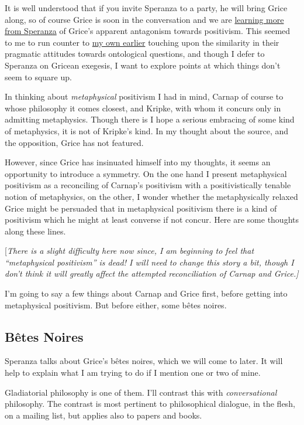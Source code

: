 \documentclass{article}
\begin{document}
It is well understood that if you invite Speranza to a party, he will bring Grice along, so of course Grice is soon in the conversation and we are \href{http://rbjones.com/pipermail/hist-analytic_rbjones.com/2009q2/000268.html}{learning more from Speranza} of Grice's apparent antagonism towards positivism.
This seemed to me to run counter to \href{http://rbjones.com/pipermail/hist-analytic_rbjones.com/2009q2/000254.html}{my own earlier} touching upon the similarity in their pragmatic attitudes towards ontological questions, and though I defer to Speranza on Gricean exegesis, I want to explore points at which things don't seem to square up.

In thinking about {\it metaphysical} positivism I had in mind, Carnap of course to whose philosophy it comes closest, and Kripke, with whom it concurs only in admitting metaphysics.
Though there is I hope a serious embracing of some kind of metaphysics, it is not of Kripke's kind.
In my thought about the source, and the opposition, Grice has not featured.

However, since Grice has insinuated himself into my thoughts, it seems an opportunity to introduce a symmetry.
On the one hand I present metaphysical positivism as a reconciling of Carnap's positivism with a positivistically tenable notion of metaphysics, on the other, I wonder whether the metaphysically relaxed Grice might be persuaded that in metaphysical positivism there is a kind of positivism which he might at least converse if not concur. 
Here are some thoughts along these lines.

{[\it There is a slight difficulty here now since, I am beginning to feel that ``metaphysical positivism'' is dead!
I will need to change this story a bit, though I don't think it will greatly affect the attempted reconciliation of Carnap and Grice.]}

I'm going to say a few things about Carnap and Grice first, before getting into metaphysical positivism. 
But before either, some b\^{e}tes noires.

\subsection{B\^{e}tes Noires}

Speranza talks about Grice's b\^{e}tes noires, which we will come to later.
It will help to explain what I am trying to do if I mention one or two of mine.

Gladiatorial philosophy is one of them.
I'll contrast this with {\it conversational} philosophy.
The contrast is most pertinent to philosophical dialogue, in the flesh, on a mailing list, but applies also to papers and books.
\end{document}
